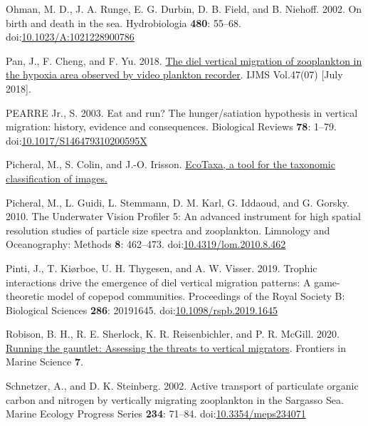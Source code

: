 \documentclass[
  letterpaper,
  DIV=11,
  numbers=noendperiod]{scrartcl}
\newlength{\cslhangindent}
\newlength{\cslentryspacingunit} %
\newenvironment{CSLReferences}[2] %
 {%
  \setlength{\parindent}{0pt}
  \ifodd #1
  \let\oldpar\par
  \def\par{\hangindent=\cslhangindent\oldpar}
  \fi
  \setlength{\parskip}{#2\cslentryspacingunit}
 }%
 {}
\begin{document}
\begin{CSLReferences}{1}{0}
\leavevmode{}%
Ohman, M. D., J. A. Runge, E. G. Durbin, D. B. Field, and B. Niehoff.
2002. On birth and death in the sea. Hydrobiologia \textbf{480}: 55--68.
doi:\href{https://doi.org/10.1023/A:1021228900786}{10.1023/A:1021228900786}

\leavevmode{}%
Pan, J., F. Cheng, and F. Yu. 2018.
\href{http://nopr.niscpr.res.in/handle/123456789/44619}{The diel
vertical migration of zooplankton in the hypoxia area observed by video
plankton recorder}. IJMS Vol.47(07) {[}July 2018{]}.

\leavevmode{}%
PEARRE Jr., S. 2003. Eat and run? The hunger/satiation hypothesis in
vertical migration: history, evidence and consequences. Biological
Reviews \textbf{78}: 1--79.
doi:\href{https://doi.org/10.1017/S146479310200595X}{10.1017/S146479310200595X}

\leavevmode{}%
Picheral, M., S. Colin, and J.-O. Irisson.
\href{http://ecotaxa.obs-vlfr.fr}{EcoTaxa, a tool for the taxonomic
classification of images.}

\leavevmode{}%
Picheral, M., L. Guidi, L. Stemmann, D. M. Karl, G. Iddaoud, and G.
Gorsky. 2010. The Underwater Vision Profiler 5: An advanced instrument
for high spatial resolution studies of particle size spectra and
zooplankton. Limnology and Oceanography: Methods \textbf{8}: 462--473.
doi:\href{https://doi.org/10.4319/lom.2010.8.462}{10.4319/lom.2010.8.462}

\leavevmode{}%
Pinti, J., T. Kiørboe, U. H. Thygesen, and A. W. Visser. 2019. Trophic
interactions drive the emergence of diel vertical migration patterns: A
game-theoretic model of copepod communities. Proceedings of the Royal
Society B: Biological Sciences \textbf{286}: 20191645.
doi:\href{https://doi.org/10.1098/rspb.2019.1645}{10.1098/rspb.2019.1645}

\leavevmode{}%
Robison, B. H., R. E. Sherlock, K. R. Reisenbichler, and P. R. McGill.
2020.
\href{https://www.frontiersin.org/articles/10.3389/fmars.2020.00064}{Running
the gauntlet: Assessing the threats to vertical migrators}. Frontiers in
Marine Science \textbf{7}.

\leavevmode{}%
Schnetzer, A., and D. K. Steinberg. 2002. Active transport of
particulate organic carbon and nitrogen by vertically migrating
zooplankton in the Sargasso Sea. Marine Ecology Progress Series
\textbf{234}: 71--84.
doi:\href{https://doi.org/10.3354/meps234071}{10.3354/meps234071}


\end{CSLReferences}
\end{document}
